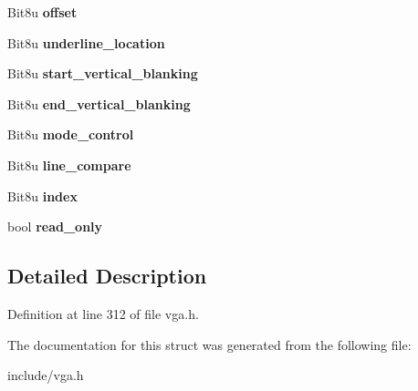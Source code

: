 \begin{DoxyCompactItemize}
\item 
\hypertarget{structVGA__Crtc_a4924ee33276c5db26c158fdf870a6dd8}{Bit8u {\bfseries offset}}\label{structVGA__Crtc_a4924ee33276c5db26c158fdf870a6dd8}

\item 
\hypertarget{structVGA__Crtc_a2219c487b03bb85f3ee0588f98d1d6a6}{Bit8u {\bfseries underline\-\_\-location}}\label{structVGA__Crtc_a2219c487b03bb85f3ee0588f98d1d6a6}

\item 
\hypertarget{structVGA__Crtc_a05e8dd8080f625dceb9b0f4b3306a346}{Bit8u {\bfseries start\-\_\-vertical\-\_\-blanking}}\label{structVGA__Crtc_a05e8dd8080f625dceb9b0f4b3306a346}

\item 
\hypertarget{structVGA__Crtc_a85198ae7825925a3350637af0e91ddc9}{Bit8u {\bfseries end\-\_\-vertical\-\_\-blanking}}\label{structVGA__Crtc_a85198ae7825925a3350637af0e91ddc9}

\item 
\hypertarget{structVGA__Crtc_a4786b1dec0548282000ee6842cdc818f}{Bit8u {\bfseries mode\-\_\-control}}\label{structVGA__Crtc_a4786b1dec0548282000ee6842cdc818f}

\item 
\hypertarget{structVGA__Crtc_a5a1744696d3efa6453e94c7283df9cb6}{Bit8u {\bfseries line\-\_\-compare}}\label{structVGA__Crtc_a5a1744696d3efa6453e94c7283df9cb6}

\item 
\hypertarget{structVGA__Crtc_a25c4b8626ae66354a428340e0cfbc231}{Bit8u {\bfseries index}}\label{structVGA__Crtc_a25c4b8626ae66354a428340e0cfbc231}

\item 
\hypertarget{structVGA__Crtc_a4775a262d32dd75cede031b15845a1eb}{bool {\bfseries read\-\_\-only}}\label{structVGA__Crtc_a4775a262d32dd75cede031b15845a1eb}

\end{DoxyCompactItemize}


\subsection{Detailed Description}


Definition at line 312 of file vga.\-h.



The documentation for this struct was generated from the following file\-:\begin{DoxyCompactItemize}
\item 
include/vga.\-h\end{DoxyCompactItemize}
